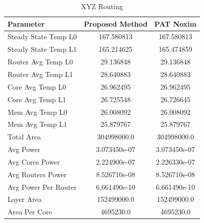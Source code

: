 \documentclass[conference]{IEEEtran}
\begin{document}
	\begin{table}[h!]
		\centering
		\begin{tabular}{|l|c|c|}
			\hline
			\textbf{Parameter} & \textbf{Proposed Method} & \textbf{PAT Noxim} \\ \hline
			Steady State Temp L0 & 167.580813 & 167.580813 \\ \hline
			Steady State Temp L1 & 165.214625 & 165.474859 \\ \hline
			Router Avg Temp L0 & 29.136848 & 29.136848 \\ \hline
			Router Avg Temp L1 & 28.640883 & 28.640883 \\ \hline
			Core Avg Temp L0 & 26.962495 & 26.962495 \\ \hline
			Core Avg Temp L1 & 26.725548 & 26.726645 \\ \hline
			Mem Avg Temp L0 & 26.008092 & 26.008092 \\ \hline
			Mem Avg Temp L1 & 25.879767 & 25.879767 \\ \hline
			Total Area & 304998000.0 & 304998000.0 \\ \hline
			Avg Power & 3.073450e-07 & 3.073450e-07 \\ \hline
			Avg Cores Power & 2.224900e-07 & 2.226330e-07 \\ \hline
			Avg Routers Power & 8.526710e-08 & 8.526710e-08 \\ \hline
			Avg Power Per Router & 6.661490e-10 & 6.661490e-10 \\ \hline
			Layer Area & 152499000.0 & 152499000.0 \\ \hline
			Area Per Core & 4695230.0 & 4695230.0 \\ \hline
		\end{tabular}
		\caption{XYZ Routing}
		\label{table:xyz_routing}
	\end{table}
	
\end{document}
